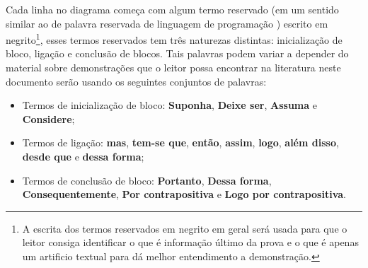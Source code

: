 Cada linha no diagrama começa com algum termo reservado (em um sentido similar ao de palavra reservada de linguagem de programação \cite{aho2007, cooper2017}) escrito em negrito\footnote{A escrita dos termos reservados em negrito em geral será usada para que o leitor consiga identificar o que é informação último da prova e o que é apenas um artificio textual para dá melhor entendimento a demonstração.}, esses termos reservados tem três naturezas distintas: inicialização de bloco, ligação e conclusão de blocos. Tais palavras podem variar a depender do material sobre demonstrações que o leitor possa encontrar na literatura neste documento serão usando os seguintes conjuntos de palavras:

\begin{itemize}
	\item Termos de inicialização de bloco: \textbf{Suponha}, \textbf{Deixe ser}, \textbf{Assuma} e \textbf{Considere};
	\item Termos de ligação: \textbf{mas}, \textbf{tem-se que}, \textbf{então}, \textbf{assim}, \textbf{logo}, \textbf{além disso}, \textbf{desde que} e \textbf{dessa forma};
  \item Termos de conclusão de bloco: \textbf{Portanto}, \textbf{Dessa forma}, \textbf{Consequentemente}, \textbf{Por contrapositiva} e \textbf{Logo por contrapositiva}.
\end{itemize}


